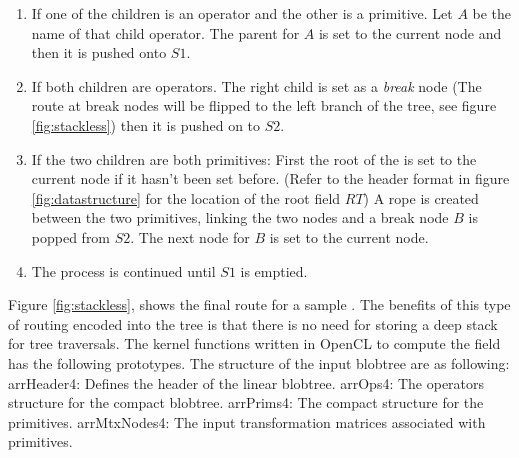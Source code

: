 \begin{enumerate}
 \item If one of the children is an operator and the other is a primitive. Let $A$ be the name of that child operator. The parent for $A$ is set 
 to the current node and then it is pushed onto $S1$.
 
 \item If both children are operators. The right child is set as a \textit{break} node (The route at break nodes will be flipped to 
 the left branch of the tree, see figure \ref{fig:stackless}) then it is pushed on to $S2$.
 
 \item If the two children are both primitives: First the root of the \blob is set to the current node if it hasn't been set before.
  (Refer to the \blob header format in figure \ref{fig:datastructure} for the location of the root field $RT$) 
  A rope is created between the two primitives, linking the two nodes and a break node $B$ is popped from $S2$. 
  The next node for $B$ is set to the current node.
 
  
 \item The process is continued until $S1$ is emptied.
\end{enumerate}


Figure \ref{fig:stackless}, shows the final route for a sample \blob. The benefits of this type of routing encoded into the tree
is that there is no need for storing a deep stack for tree traversals. The kernel functions written in OpenCL to compute the field
has the following prototypes. The structure of the input blobtree are as following:
arrHeader4: Defines the header of the linear blobtree.
arrOps4: The operators structure for the compact blobtree.
arrPrims4: The compact structure for the primitives.
arrMtxNodes4: The input transformation matrices associated with primitives.


